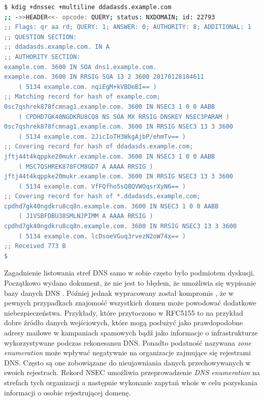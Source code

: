 \begin{lstlisting}[label={list:dnssec_nx_domain},captionpos=b,caption=Odpowiedź na zapytanie DNSSEC o nieistniejącą domenę (na podstawie \cite{dnssec_nxdomain}).,language=bash]
$ kdig +dnssec +multiline ddadasds.example.com
;; ->>HEADER<<- opcode: QUERY; status: NXDOMAIN; id: 22793
;; Flags: qr aa rd; QUERY: 1; ANSWER: 0; AUTHORITY: 8; ADDITIONAL: 1
;; QUESTION SECTION:
;; ddadasds.example.com. IN A
;; AUTHORITY SECTION:
example.com. 3600 IN SOA dns1.example.com.
example.com. 3600 IN RRSIG SOA 13 2 3600 20170128184611
    ( 5134 example.com. nqiEgM+kVBDeBI== )
;; Matching record for hash of example.com;
0sc7qshrek878fcmnag1.example.com. 3600 IN NSEC3 1 0 0 AABB
    ( CPDHD7GK40NGDKRU8CQ8 NS SOA MX RRSIG DNSKEY NSEC3PARAM )
0sc7qshrek878fcmnag1.example.com. 3600 IN RRSIG NSEC3 13 3 3600
    ( 5134 example.com. 2JicIoTH3WkgAjbP/ehmTv== )
;; Covering record for hash of ddadasds.example.com;
jftj44t4kqppke20mukr.example.com. 3600 IN NSEC3 1 0 0 AABB
    ( MSC7QSHREK878FCM8GD7 A AAAA RRSIG )
jftj44t4kqppke20mukr.example.com. 3600 IN RRSIG NSEC3 13 3 3600
    ( 5134 example.com. VfFQfho5sQ8QVWOqsrXyN6== )
;; Covering record for hash of *.ddadasds.example.com;
cpdhd7gk40ngdkru8cq8n.example.com. 3600 IN NSEC3 1 0 0 AABB
    ( J1VSBFDBU38SMLNJPIMM A AAAA RRSIG )
cpdhd7gk40ngdkru8cq8n.example.com. 3600 IN RRSIG NSEC3 13 3 3600
    ( 5134 example.com. lcDsoeVGuq3rvezN2oW74x== )
;; Received 773 B
$
\end{lstlisting}

Zagadnienie listowania stref DNS samo w sobie często było podmiotem dyskusji. Początkowo wydano dokument, że nie jest to błędem,
że umożliwia się wypisanie bazy danych DNS \cite{RFC4033}. Później jednak wypracowany został kompromis \cite{RFC5155}, że w pewnych
przypadkach znajomość wszystkich domen może powodować dodatkowe niebezpieczeństwa. Przykłady, które przytoczono w RFC5155 \cite{RFC5155}
to na przykład dobre źródło danych wejściowych, które mogą posłużyć jako prawdopodobne adresy mailowe w kampaniach spamowych bądź
jako informacje o infrastrukturze wykorzystywane podczas rekonesansu DNS. Ponadto podatność nazywana \textit{zone enumeration}
może wpływać negatywnie na organizacje zajmujące się rejestrami DNS. Często są one zobowiązane do nieujawniania danych przechowywanych w
swoich rejestrach. Rekord NSEC umożliwia przeprowadzenie \textit{DNS enumeration} na strefach tych organizacji a następnie wykonanie
zapytań whois \cite{RFC3912} w celu pozyskania informacji o osobie rejestrującej domenę.
